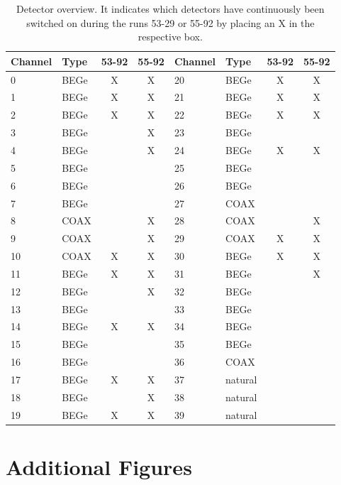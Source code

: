 \begin{table}
    \centering
	\begin{tabular}{|l|l|c|c||l|l|c|c|}
		\hline
		Channel & Type & 53-92 & 55-92 & Channel & Type & 53-92 & 55-92 \\
		\hline
		0 & BEGe & X & X & 20 & BEGe & X & X \\
		\hline
		1 & BEGe & X & X & 21 & BEGe & X & X \\
		\hline
		2 & BEGe & X & X & 22 & BEGe & X & X \\
		\hline
		3 & BEGe &  & X & 23 & BEGe &  &  \\
		\hline
		4 & BEGe &  & X & 24 & BEGe & X & X \\
		\hline
		5 & BEGe &  &  & 25 & BEGe &  &  \\
		\hline
		6 & BEGe &  &  & 26 & BEGe &  &  \\
		\hline
		7 & BEGe &  &  & 27 & COAX &  &  \\
		\hline
		8 & COAX &  & X & 28 & COAX &  & X \\
		\hline
		9 & COAX &  & X & 29 & COAX & X & X \\
		\hline
		10 & COAX & X & X & 30 & BEGe & X & X \\
		\hline
		11 & BEGe & X & X & 31 & BEGe &  & X \\
		\hline
		12 & BEGe &  & X & 32 & BEGe &  &  \\
		\hline
		13 & BEGe &  &  & 33 & BEGe &  &  \\
		\hline
		14 & BEGe & X & X & 34 & BEGe & &  \\
		\hline
		15 & BEGe &  &  & 35 & BEGe &  &  \\
		\hline
		16 & BEGe &  &  & 36 & COAX &  &  \\
		\hline
		17 & BEGe & X & X & 37 & natural &  &  \\
		\hline
		18 & BEGe &  & X & 38 & natural &  &  \\
		\hline
		19 & BEGe & X & X & 39 & natural &  &  \\
		\hline
	\end{tabular}
	\caption{Detector overview. It indicates which detectors have continuously been switched on during the runs 53-29 or 55-92 by placing an X in the respective box.}
	\label{tab:Detector}
\end{table}
\iffalse
\chapter{Additional Figures}
\label{sec:ResDetermination}


